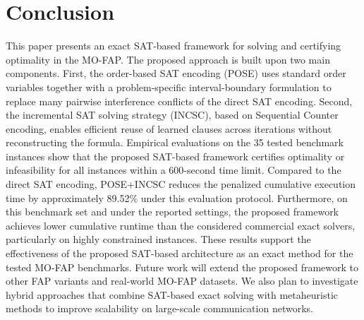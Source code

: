 \documentclass[letterpaper,journal]{IEEEtran}
\begin{document}
\section{Conclusion}
\label{sec:conclusion}
This paper presents an exact SAT-based framework for solving and certifying optimality in the MO-FAP. The proposed approach is built upon two main components. First, the order-based SAT encoding (POSE) uses standard order variables together with a problem-specific interval-boundary formulation to replace many pairwise interference conflicts of the direct SAT encoding. Second, the incremental SAT solving strategy (INCSC), based on Sequential Counter encoding, enables efficient reuse of learned clauses across iterations without reconstructing the formula.
Empirical evaluations on the 35 tested benchmark instances show that the proposed SAT-based framework certifies optimality or infeasibility for all instances within a 600-second time limit. Compared to the direct SAT encoding, POSE+INCSC reduces the penalized cumulative execution time by approximately 89.52\% under this evaluation protocol. Furthermore, on this benchmark set and under the reported settings, the proposed framework achieves lower cumulative runtime than the considered commercial exact solvers, particularly on highly constrained instances.
These results support the effectiveness of the proposed SAT-based architecture as an exact method for the tested MO-FAP benchmarks.
Future work will extend the proposed framework to other FAP variants and real-world MO-FAP datasets. We also plan to investigate hybrid approaches that combine SAT-based exact solving with metaheuristic methods to improve scalability on large-scale communication networks.
\end{document}
